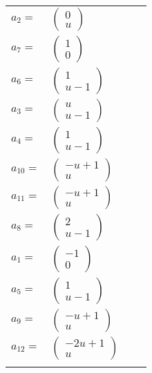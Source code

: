\documentclass[1p]{elsarticle_modified}
\theoremstyle{definition}
\begin{document}
\begin{tabular}{m{7pt} m{180pt} m{7pt} m{180pt} }
\flushright $a_{2}=$&$\begin{pmatrix}0\\u\end{pmatrix}$ \\
\flushright $a_{7}=$&$\begin{pmatrix}1\\0\end{pmatrix}$ \\
\flushright $a_{6}=$&$\begin{pmatrix}1\\u-1\end{pmatrix}$ \\
\flushright $a_{3}=$&$\begin{pmatrix}u\\u-1\end{pmatrix}$ \\
\flushright $a_{4}=$&$\begin{pmatrix}1\\u-1\end{pmatrix}$ \\
\flushright $a_{10}=$&$\begin{pmatrix}- u+1\\u\end{pmatrix}$ \\
\flushright $a_{11}=$&$\begin{pmatrix}- u+1\\u\end{pmatrix}$ \\
\flushright $a_{8}=$&$\begin{pmatrix}2\\u-1\end{pmatrix}$ \\
\flushright $a_{1}=$&$\begin{pmatrix}-1\\0\end{pmatrix}$ \\
\flushright $a_{5}=$&$\begin{pmatrix}1\\u-1\end{pmatrix}$ \\
\flushright $a_{9}=$&$\begin{pmatrix}- u+1\\u\end{pmatrix}$ \\
\flushright $a_{12}=$&$\begin{pmatrix}-2 u+1\\u\end{pmatrix}$\\&\end{tabular}
\end{document}
